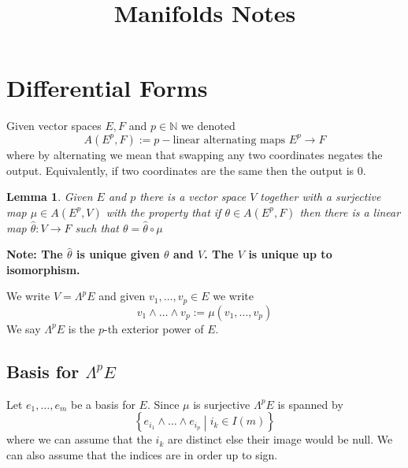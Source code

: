 \documentclass[11pt]{article}
\title{Manifolds Notes}
\author{}
\date{}
\newcommand{\defeq}{:=}
\newcommand{\relmiddle}[1]{\mathrel{}\middle#1\mathrel{}}
\newcommand{\rmv}{\relmiddle|}
\newcommand{\N}{\mathbb{N}}
\newenvironment{defin}
	{\begin{mdframed}[backgroundcolor=white, roundcorner=5pt, linewidth=1pt]
		\setlength{\parindent}{0pt}
		}
	{\end{mdframed}}
\newcommand{\mdf}[1]{{\color{red} #1}}
\newenvironment{note}
	{\begin{mdframed}[backgroundcolor=white, linecolor=red, roundcorner=5pt, linewidth=1pt]\bfseries{Note:}\normalfont}
	{\end{mdframed}}
\newtheorem{lemma}[theorem]{Lemma}
\begin{document}
\maketitle

\section{Differential Forms}
\begin{defin}
Given vector spaces $E, F$ and $p\in \N$ we denoted
\[
	A(E^p, F)\defeq p-\text{linear alternating maps }E^p\to F
\]
where by alternating we mean that swapping any two coordinates negates the output.
Equivalently, if two coordinates are the same then the output is $0$.
\end{defin}

\begin{lemma}
Given $E$ and $p$ there is a vector space $V$ together with a surjective map $\mu\in A(E^p, V)$ with the property that if $\theta\in A(E^p, F)$ then there is a linear map $\hat{\theta}:V\to F$ such that $\theta = \hat{\theta}\circ\mu$
\end{lemma}

\begin{figure}[H]
	\centering
\end{figure}

\begin{note}
	The $\hat{\theta}$ is unique given $\theta$ and $V$.
	The $V$ is unique up to isomorphism.
\end{note}

\begin{defin}
We write $V = \Lambda^p E$ and given $v_1, \dots , v_p\in E$ we write
\[
	v_1 \wedge \dots \wedge v_p \defeq \mu(v_1, \dots ,v_p)
\]
We say $\Lambda^p E$ is the \mdf{$p$-th exterior power of $E$}.
\end{defin}

\subsection{Basis for $\Lambda^p E$}
Let $e_1, \dots , e_m$ be a basis for $E$.
Since $\mu$ is surjective $\Lambda^p E$ is spanned by
\[
	\left\{ e_{i_1} \wedge \dots \wedge e_{i_p} \rmv i_k\in I(m) \right\}
\]
where we can assume that the $i_k$ are distinct else their image would be null.
We can also assume that the indices are in order up to sign.
\end{document}

